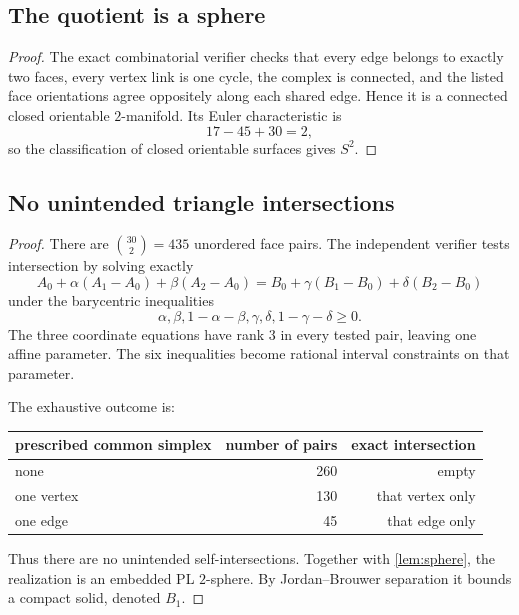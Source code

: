 \subsection{The quotient is a sphere}

\begin{proof}
The exact combinatorial verifier checks that every edge belongs to exactly two faces, every vertex link is one cycle, the complex is connected, and the listed face orientations agree oppositely along each shared edge.  Hence it is a connected closed orientable $2$-manifold.  Its Euler characteristic is
\[
17-45+30=2,
\]
so the classification of closed orientable surfaces gives $S^2$.
\end{proof}

\subsection{No unintended triangle intersections}

\begin{proof}
There are $\binom{30}{2}=435$ unordered face pairs.  The independent verifier tests intersection by solving exactly
\[
A_0+\alpha(A_1-A_0)+\beta(A_2-A_0)
=
B_0+\gamma(B_1-B_0)+\delta(B_2-B_0)
\]
under the barycentric inequalities
\[
\alpha,\beta,1-\alpha-\beta,\gamma,\delta,1-\gamma-\delta\ge0.
\]
The three coordinate equations have rank $3$ in every tested pair, leaving one affine parameter.  The six inequalities become rational interval constraints on that parameter.

The exhaustive outcome is:
\begin{center}
\begin{tabular}{@{}lrr@{}}
\toprule
prescribed common simplex & number of pairs & exact intersection\\
\midrule
none & 260 & empty\\
one vertex & 130 & that vertex only\\
one edge & 45 & that edge only\\
\bottomrule
\end{tabular}
\end{center}
Thus there are no unintended self-intersections.  Together with \cref{lem:sphere}, the realization is an embedded PL $2$-sphere.  By Jordan--Brouwer separation it bounds a compact solid, denoted $B_1$.
\end{proof}

